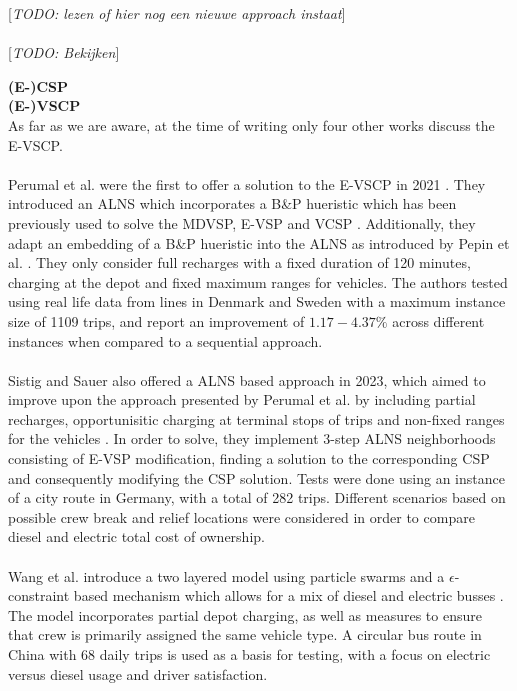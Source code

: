 \documentclass[ht]{article}
\newcommand{\todo}[1]{{\color{red}[\textit{TODO: #1}]}}
\begin{document}
\todo{lezen of hier nog een nieuwe approach instaat} \cite{Sassi2014} \\\\
\todo{Bekijken} \cite{Borndörfer2024}

\noindent \textbf{(E-)CSP}\\

\noindent \textbf{(E-)VSCP}\\
As far as we are aware, at the time of writing only four other works discuss the E-VSCP. \\\\

Perumal et al. were the first to offer a solution to the E-VSCP in 2021 \cite{Perumal2021}. They introduced an ALNS which incorporates a B\&P hueristic which has been previously used to solve the MDVSP, E-VSP and VCSP \cite{Pepin2009, Haase1996, vanKootenNiekerk2017}. Additionally, they adapt an embedding of a B\&P hueristic into the ALNS as introduced by Pepin et al. \cite{Pepin2009}. They only consider full recharges with a fixed duration of 120 minutes, charging at the depot and fixed maximum ranges for vehicles. The authors tested using real life data from lines in Denmark and Sweden with a maximum instance size of 1109 trips, and report an improvement of $1.17-4.37\%$ across different instances when compared to a sequential approach. \\\\

Sistig and Sauer also offered a ALNS based approach in 2023, which aimed to improve upon the approach presented by Perumal et al. by including partial recharges, opportunisitic charging at terminal stops of trips and non-fixed ranges for the vehicles \cite{Sistig2023}. In order to solve, they implement 3-step ALNS neighborhoods consisting of E-VSP modification, finding a solution to the corresponding CSP and consequently modifying the CSP solution. Tests were done using an instance of a city route in Germany, with a total of 282 trips. Different scenarios based on possible crew break and relief locations were considered in order to compare diesel and electric total cost of ownership. \\\\

Wang et al. introduce a two layered model using particle swarms and a $\epsilon$-constraint based mechanism which allows for a mix of diesel and electric busses \cite{Wang2022}. The model incorporates partial depot charging, as well as measures to ensure that crew is primarily assigned the same vehicle type. A circular bus route in China with 68 daily trips is used as a basis for testing, with a focus on electric versus diesel usage and driver satisfaction. \\\\
\end{document}
